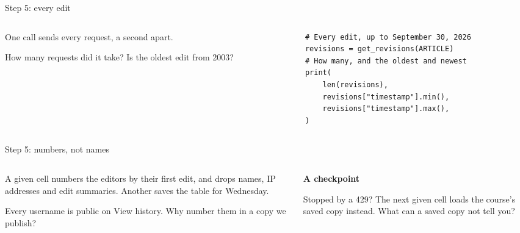 \documentclass[9pt,aspectratio=169]{beamer}
\begin{document}
\begin{frame}[fragile]{Step 5: every edit}
    \begin{columns}[T]
        \begin{column}{0.37\textwidth}
            One call sends every request, a second apart.

            \medskip
            How many requests did it take? Is the oldest edit from 2003?
        \end{column}
        \begin{column}{0.6\textwidth}
\begin{lstlisting}
# Every edit, up to September 30, 2026
revisions = get_revisions(ARTICLE)
# How many, and the oldest and newest
print(
    len(revisions),
    revisions["timestamp"].min(),
    revisions["timestamp"].max(),
)
\end{lstlisting}
        \end{column}
    \end{columns}
\end{frame}

\begin{frame}{Step 5: numbers, not names}
    \begin{columns}[T]
        \begin{column}{0.6\textwidth}
            A given cell numbers the editors by their first edit, and drops names, IP addresses and edit summaries. Another saves the table for Wednesday.

            \medskip
            Every username is public on View history. Why number them in a copy we publish?
        \end{column}
        \begin{column}{0.35\textwidth}
            \textbf{A checkpoint}\\[2pt]
            {\footnotesize Stopped by a 429? The next given cell loads the course's saved copy instead. What can a saved copy not tell you?\par}
        \end{column}
    \end{columns}
\end{frame}

\end{document}
